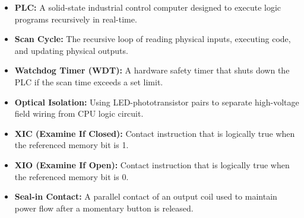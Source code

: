 \documentclass[12pt,a4paper]{article}
\begin{document}
\begin{tcolorbox}[defbox, title={\textbf{One-Line Definitions}}]
\begin{itemize}[leftmargin=*, itemsep=2pt, topsep=0pt]
  \item \textbf{PLC:} A solid-state industrial control computer designed to execute logic programs recursively in real-time.
  \item \textbf{Scan Cycle:} The recursive loop of reading physical inputs, executing code, and updating physical outputs.
  \item \textbf{Watchdog Timer (WDT):} A hardware safety timer that shuts down the PLC if the scan time exceeds a set limit.
  \item \textbf{Optical Isolation:} Using LED-phototransistor pairs to separate high-voltage field wiring from CPU logic circuit.
  \item \textbf{XIC (Examine If Closed):} Contact instruction that is logically true when the referenced memory bit is 1.
  \item \textbf{XIO (Examine If Open):} Contact instruction that is logically true when the referenced memory bit is 0.
  \item \textbf{Seal-in Contact:} A parallel contact of an output coil used to maintain power flow after a momentary button is released.
\end{itemize}
\end{tcolorbox}
\end{document}
